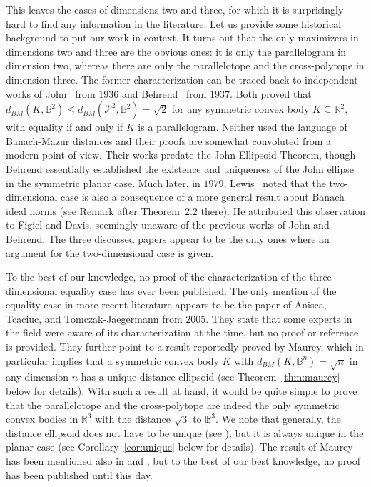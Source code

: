 \documentclass[12pt,a4paper]{article}
\theoremstyle{definition}
\newcommand\R{\mathbb{R}}
\newcommand\B{\mathbb{B}}
\newcommand\CP{\mathcal{P}}
\begin{document}
This leaves the cases of dimensions two and three, for which it is surprisingly hard to find any information in the literature. Let us provide some historical background to put our work in context. It turns out that the only maximizers in dimensions two and three are the obvious ones: it is only the parallelogram in dimension two, whereas there are only the parallelotope and the cross-polytope in dimension three. The former characterization can be traced back to independent works of John~\cite{johninert} from $1936$ and Behrend~\cite{behrend} from $1937$. Both proved that $d_{BM}(K, \B^2) \leq d_{BM}(\CP^2, \B^2) = \sqrt{2}$ for any symmetric convex body $K \subseteq \R^2$, with equality if and only if $K$ is a parallelogram. Neither used the language of Banach-Mazur distances and their proofs are somewhat convoluted from a modern point of view. Their works predate the John Ellipsoid Theorem, though Behrend essentially established the existence and uniqueness of the John ellipse in the symmetric planar case. Much later, in $1979$, Lewis~\cite{lewis} noted that the two-dimensional case is also a consequence of a more general result about Banach ideal norms (see Remark after Theorem~$2.2$ there). He attributed this observation to Figiel and Davis, seemingly unaware of the previous works of John and Behrend. The three discussed papers appear to be the only ones where an argument for the two-dimensional case is given.

To the best of our knowledge, no proof of the characterization of the three-dimensional equality case has ever been published. The only mention of the equality case in more recent literature appears to be the paper \cite{tomczakstructure} of Anisca, Tcaciuc, and Tomczak-Jaegermann from $2005$. They state that some experts in the field were aware of its characterization at the time, but no proof or reference is provided. They further point to a result reportedly proved by Maurey, which in particular implies that a symmetric convex body $K$ with $d_{BM}(K,\B^n) = \sqrt{n}$ in any dimension $n$ has a unique distance ellipsoid (see Theorem~\ref{thm:maurey} below for details). With such a result at hand, it would be quite simple to prove that the parallelotope and the cross-polytope are indeed the only symmetric convex bodies in $\R^3$ with the distance $\sqrt{3}$ to $\B^3$. We note that generally, the distance ellipsoid does not have to be unique (see \cite[Lemma~$2.2$]{praetorius}), but it is always unique in the planar case (see Corollary~\ref{cor:unique} below for details). The result of Maurey has been mentioned also in \cite[Remark~$1.2$]{arias} and \cite{praetorius}, but to the best of our best knowledge, no proof has been published until this day.
\end{document}
